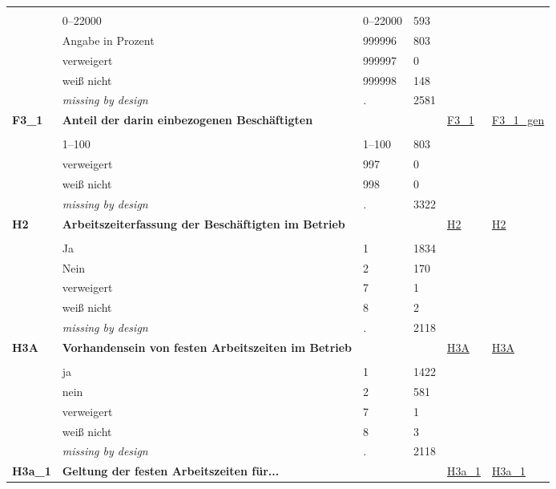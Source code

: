 \begin{longtable}{| L{2.45cm} | L{6cm} | C{1.5cm} | R{1cm} | C{2.25cm} | C{2.25cm} |}
   &  &  &  &  &  \\ 
   & 0--22000 & 0--22000 & 593 &  &  \\ 
   & Angabe in Prozent & 999996 & 803 &  &  \\ 
   & verweigert & 999997 & 0 &  &  \\ 
   & weiß nicht & 999998 & 148 &  &  \\ 
   & \textit{missing by design} & \textit{.} & 2581 &  &  \\ 
   \midrule
\textbf{F3\_1}\label{var:F3:1} & \textbf{Anteil der darin einbezogenen Beschäftigten} &  &  & \hyperref[F3:1]{F3\_1} & \hyperref[var:suf:F3:1:gen]{F3\_1\_gen} \\ 
   &  &  &  &  &  \\ 
   & 1--100 & 1--100 & 803 &  &  \\ 
   & verweigert & 997 & 0 &  &  \\ 
   & weiß nicht & 998 & 0 &  &  \\ 
   & \textit{missing by design} & \textit{.} & 3322 &  &  \\ 
   \midrule
\textbf{H2}\label{var:H2} & \textbf{Arbeitszeiterfassung der Beschäftigten im Betrieb} &  &  & \hyperref[H2]{H2} & \hyperref[var:suf:H2]{H2} \\ 
   &  &  &  &  &  \\ 
   & Ja & 1 & 1834 &  &  \\ 
   & Nein & 2 & 170 &  &  \\ 
   & verweigert & 7 & 1 &  &  \\ 
   & weiß nicht & 8 & 2 &  &  \\ 
   & \textit{missing by design} & \textit{.} & 2118 &  &  \\ 
   \midrule
\textbf{H3A}\label{var:H3A} & \textbf{Vorhandensein von festen Arbeitszeiten im Betrieb} &  &  & \hyperref[H3A]{H3A} & \hyperref[var:suf:H3A]{H3A} \\ 
   &  &  &  &  &  \\ 
   & ja & 1 & 1422 &  &  \\ 
   & nein & 2 & 581 &  &  \\ 
   & verweigert & 7 & 1 &  &  \\ 
   & weiß nicht & 8 & 3 &  &  \\ 
   & \textit{missing by design} & \textit{.} & 2118 &  &  \\ 
   \midrule
\textbf{H3a\_1}\label{var:H3a:1} & \textbf{Geltung der festen Arbeitszeiten für...} &  &  & \hyperref[H3a:1]{H3a\_1} & \hyperref[var:suf:H3a:1]{H3a\_1} \\ 

\end{longtable}
